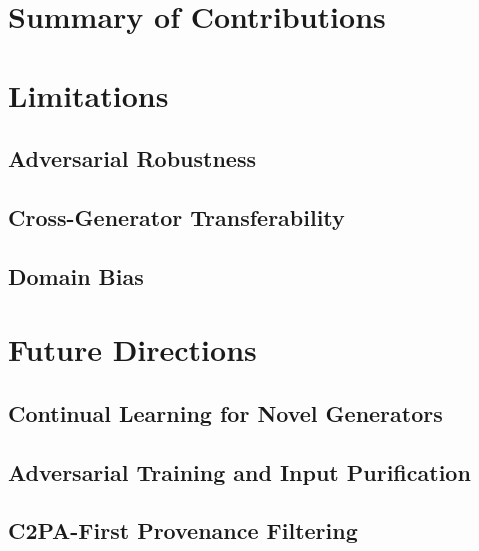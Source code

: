 \section{Summary of Contributions}\label{sec:summary}

\section{Limitations}\label{sec:limitations}
\subsection{Adversarial Robustness}
\subsection{Cross-Generator Transferability}
\subsection{Domain Bias}

\section{Future Directions}\label{sec:future}
\subsection{Continual Learning for Novel Generators}
\subsection{Adversarial Training and Input Purification}
\subsection{C2PA-First Provenance Filtering}



% 
% 



